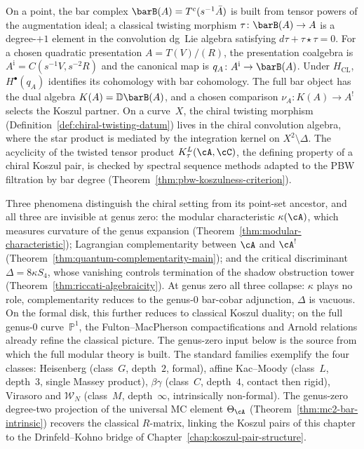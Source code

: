 On a point, the bar complex
$\barB(A) = T^c(s^{-1}\bar{A})$ is built from tensor powers of
the augmentation ideal; a classical twisting morphism
$\tau \colon \barB(A) \to A$ is a degree-$+1$ element in the
convolution dg~Lie algebra satisfying $d\tau + \tau \star \tau = 0$.
For a chosen quadratic presentation $A=T(V)/(R)$, the presentation
coalgebra is $A^{\mathrm i}=C(s^{-1}V,s^{-2}R)$ and the canonical map
is $q_A\colon A^{\mathrm i}\to\barB(A)$.  Under $H_{\mathrm{CL}}$,
$H^\bullet(q_A)$ identifies its cohomology with bar cohomology.  The
full bar object has the dual algebra
$K(A)=\mathbb D\barB(A)$, and a chosen comparison
$\nu_A\colon K(A)\to A^!$ selects the Koszul partner.
On a curve~$X$, the chiral twisting morphism
(Definition~\ref{def:chiral-twisting-datum}) lives in the chiral
convolution algebra, where the star product is mediated by the
integration kernel on $X^2 \setminus \Delta$. The acyclicity of
the twisted tensor product $K_\tau^L(\cA, \cC)$, the defining
property of a chiral Koszul pair, is checked by spectral sequence
methods adapted to the PBW filtration by bar degree
(Theorem~\ref{thm:pbw-koszulness-criterion}).

Three phenomena distinguish the chiral setting from its
point-set ancestor, and all three are invisible at genus zero:
the modular characteristic $\kappa(\cA)$, which measures
curvature of the genus expansion
(Theorem~\ref{thm:modular-characteristic});
Lagrangian complementarity between $\cA$ and $\cA^!$
(Theorem~\ref{thm:quantum-complementarity-main});
and the critical discriminant $\Delta = 8\kappa S_4$, whose
vanishing controls termination of the shadow obstruction tower
(Theorem~\ref{thm:riccati-algebraicity}).
At genus zero all three collapse: $\kappa$ plays no role,
complementarity reduces to the genus-$0$ bar-cobar adjunction,
$\Delta$ is vacuous. On the formal disk, this further reduces
to classical Koszul duality; on the full genus-$0$
curve~$\mathbb{P}^1$, the Fulton--MacPherson compactifications
and Arnold relations already refine the classical picture. The
genus-zero input below is the source from which the
full modular theory is built. The standard families exemplify the four
classes: Heisenberg (class~$G$, depth~$2$, formal), affine
Kac--Moody (class~$L$, depth~$3$, single Massey product),
$\beta\gamma$ (class~$C$, depth~$4$, contact then rigid),
Virasoro and $\mathcal{W}_N$ (class~$M$, depth~$\infty$,
intrinsically non-formal). The genus-zero degree-two projection
of the universal MC element $\Theta_\cA$
(Theorem~\ref{thm:mc2-bar-intrinsic}) recovers the classical
$R$-matrix, linking the Koszul pairs of this chapter to the
Drinfeld--Kohno bridge of
Chapter~\ref{chap:koszul-pair-structure}.

